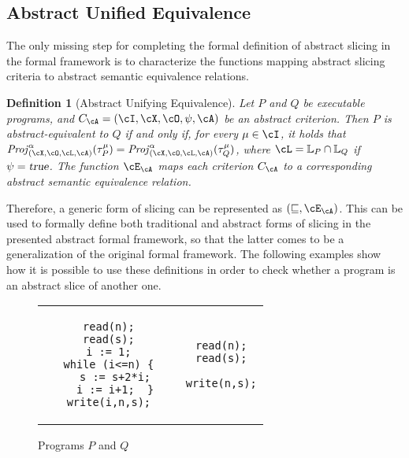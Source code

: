 \documentclass[prodmode,acmtocl]{acmsmall}
\newcommand{\caX}{\cX}
\def\prog{\ensuremath{P}\xspace}
\def\progq{\ensuremath{Q}\xspace}
\def\trace{\ensuremath{\tau}\xspace}
\def\memory{\ensuremath{\mu}\xspace}
\def\lnums{\ensuremath{\mathbb{L}}\xspace}
\def\crit{\ensuremath{C}\xspace}
\def\Proj{\ensuremath{\mathit{Proj}}\xspace}
\newcommand{\true}{\mbox{\sl true}}
\newcommand{\0}{\mbox{\bf 0}}
\newtheorem{mydefinition}[theorem]{Definition}
\begin{document}
\subsection{Abstract Unified Equivalence}
\label{subsection:AbstractUnifiedEquivalence}

The only missing step for completing the formal definition of abstract
slicing in the formal framework is to characterize the functions
mapping abstract slicing criteria to abstract semantic equivalence
relations.

\begin{mydefinition}[Abstract Unifying Equivalence]
  \label{def:AbstractUnifiedEquivalence} Let $\prog$ and $\progq$ be
  executable programs, and $\crit_\cA=(\cI,\caX,\cO,\psi,\cA)$ be an
  abstract criterion.  Then $\prog$ is \emph{abstract-equivalent} to
  $\progq$ if and only if, for every $\memory\in \cI$, it holds that
  $\Proj^{\alpha}_{(\caX, \cO, \cL,\cA)}(\trace_\prog^\memory)
  = \Proj^{\alpha}_{(\caX,\cO,\cL,\cA)}(\trace_\progq^\memory)$, where
  $\cL=\lnums_\prog\cap \lnums_\progq$ if $\psi=\true$.  The
  function $\cE_\cA$ maps each criterion $\crit_{\cA}$ to a
  corresponding abstract semantic equivalence relation.
\end{mydefinition}

Therefore, a generic form of slicing can be represented as
$(\sqsubseteq,\cE_{\cA})$.  This can be used to formally define both
traditional and abstract forms of slicing in the presented abstract
formal framework, so that the latter comes to be a generalization of
the original formal framework.  The following examples show how it is
possible to use these definitions in order to check whether a program
is an abstract slice of another one.

\begin{figure}
  \begin{center}
    \begin{tabular}{c@{\quad}|@{\quad}c}
      \begin{lstlisting}
   read(n);
   read(s);
   i := 1;
   while (i<=n) {
     s := s+2*i;
     i := i+1;  }
   write(i,n,s);
      \end{lstlisting}
      &
      \begin{lstlisting}
   read(n);
   read(s);
   
   write(n,s);
      \end{lstlisting}
    \end{tabular}
  \end{center}
  \caption{Programs \prog and \progq}\label{fig:PandQ}
\end{figure}
\end{document}
